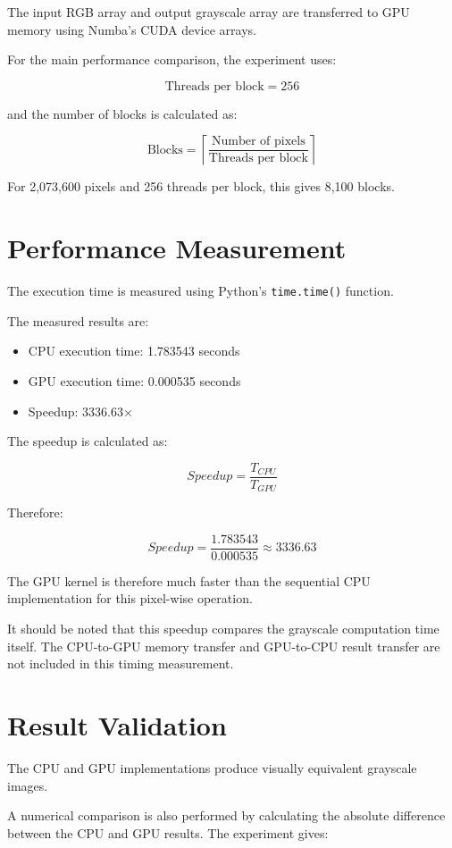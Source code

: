 \documentclass[11pt]{article}
\begin{document}
The input RGB array and output grayscale array are transferred to GPU memory using Numba's CUDA device arrays.

For the main performance comparison, the experiment uses:

$$
\text{Threads per block} = 256
$$

and the number of blocks is calculated as:

$$
\text{Blocks} =
\left\lceil
\frac{\text{Number of pixels}}
{\text{Threads per block}}
\right\rceil
$$

For 2,073,600 pixels and 256 threads per block, this gives 8,100 blocks.

\section{Performance Measurement}

The execution time is measured using Python's \texttt{time.time()} function.

The measured results are:

\begin{itemize}
\item CPU execution time: 1.783543 seconds
\item GPU execution time: 0.000535 seconds
\item Speedup: 3336.63$\times$
\end{itemize}

The speedup is calculated as:

$$
Speedup =
\frac{T_{CPU}}{T_{GPU}}
$$

Therefore:

$$
Speedup =
\frac{1.783543}{0.000535}
\approx 3336.63
$$

The GPU kernel is therefore much faster than the sequential CPU implementation for this pixel-wise operation.

It should be noted that this speedup compares the grayscale computation time itself. The CPU-to-GPU memory transfer and GPU-to-CPU result transfer are not included in this timing measurement.

\section{Result Validation}

The CPU and GPU implementations produce visually equivalent grayscale images.

A numerical comparison is also performed by calculating the absolute difference between the CPU and GPU results. The experiment gives:
\end{document}
